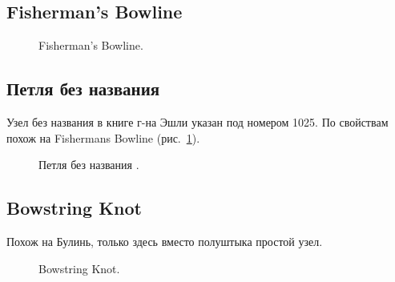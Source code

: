 \subsection{Fisherman's Bowline}

\begin{figure}[H]\centering
	\begin{minipage}{1\linewidth}
		\begin{center}
			\tcbox[enhanced jigsaw,colframe=black,opacityframe=0.5,opacityback=0.5]
			{\centering{}}
		\end{center}
	\end{minipage}
\caption{Fisherman's Bowline.}
\label{ris:Fishermans_Bowline}
\end{figure}

\addtocounter{LoopNoName}{1}

\subsection{Петля без названия }

Узел без названия в книге г-на Эшли указан под номером 1025. По свойствам похож на Fishermans Bowline (рис.~\ref{ris:Fishermans_Bowline}).

\begin{figure}[H]\centering
	\begin{minipage}{1\linewidth}
		\begin{center}
			\tcbox[enhanced jigsaw,colframe=black,opacityframe=0.5,opacityback=0.5]
			{\centering{}}
		\end{center}
	\end{minipage}
\caption{Петля без названия .}
\label{ris:ABOK_1025}
\end{figure}

\subsection{Bowstring Knot}
% 
Похож на Булинь, только здесь вместо полуштыка простой узел.

\begin{figure}[H]\centering
	\begin{minipage}{1\linewidth}
		\begin{center}
			\tcbox[enhanced jigsaw,colframe=black,opacityframe=0.5,opacityback=0.5]
			{\centering{}}
		\end{center}
	\end{minipage}
\caption{Bowstring Knot.}
\label{ris:Bowstring_Knot}
\end{figure}

